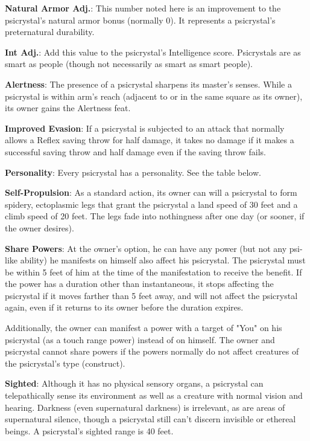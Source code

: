 \textbf{Natural Armor Adj.}: This number noted here is an improvement to the psicrystal's natural armor bonus (normally 0). It represents a psicrystal's preternatural durability.

\textbf{Int Adj.}: Add this value to the psicrystal's Intelligence score. Psicrystals are as smart as people (though not necessarily as smart as smart people).

\textbf{Alertness}: The presence of a psicrystal sharpens its master's senses. While a psicrystal is within arm's reach (adjacent to or in the same square as its owner), its owner gains the Alertness feat.

\textbf{Improved Evasion}: If a psicrystal is subjected to an attack that normally allows a Reflex saving throw for half damage, it takes no damage if it makes a successful saving throw and half damage even if the saving throw fails.

\textbf{Personality}: Every psicrystal has a personality. See the table below.

\textbf{Self-Propulsion}: As a standard action, its owner can will a psicrystal to form spidery, ectoplasmic legs that grant the psicrystal a land speed of 30 feet and a climb speed of 20 feet. The legs fade into nothingness after one day (or sooner, if the owner desires).

\textbf{Share Powers}: At the owner's option, he can have any power (but not any psi-like ability) he manifests on himself also affect his psicrystal. The psicrystal must be within 5 feet of him at the time of the manifestation to receive the benefit. If the power has a duration other than instantaneous, it stops affecting the psicrystal if it moves farther than 5 feet away, and will not affect the psicrystal again, even if it returns to its owner before the duration expires.

Additionally, the owner can manifest a power with a target of "You" on his psicrystal (as a touch range power) instead of on himself. The owner and psicrystal cannot share powers if the powers normally do not affect creatures of the psicrystal's type (construct).

\textbf{Sighted}: Although it has no physical sensory organs, a psicrystal can telepathically sense its environment as well as a creature with normal vision and hearing. Darkness (even supernatural darkness) is irrelevant, as are areas of supernatural silence, though a psicrystal still can't discern invisible or ethereal beings. A psicrystal's sighted range is 40 feet.

